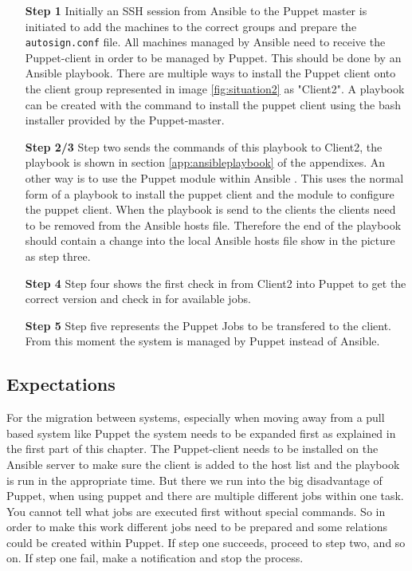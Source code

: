 \indent
\begin{itemize}
    \item[\bf Step 1] Initially an SSH session from Ansible to the Puppet master is initiated to add the machines to the correct groups and prepare the \texttt{autosign.conf} file. All machines managed by Ansible need to receive the Puppet-client in order to be managed by Puppet. This should be done by an Ansible playbook. There are multiple ways to install the Puppet client onto the client group represented in image \ref{fig:situation2} as "Client2". A playbook can be created with the command to install the puppet client using the bash installer provided by the Puppet-master.
    \item[\bf Step 2/3] Step two sends the commands of this playbook to Client2, the playbook is shown in section \ref{app:ansibleplaybook} of the appendixes. An other way is to use the Puppet module within Ansible \cite{ansiblepuppet}. This uses the normal form of a playbook to install the puppet client and the module to configure the puppet client. When the playbook is send to the clients the clients need to be removed from the Ansible hosts file. Therefore the end of the playbook should contain a change into the local Ansible hosts file show in the picture as step three.
    \item[\bf Step 4] Step four shows the first check in from Client2 into Puppet to get the correct version and check in for available jobs.
    \item[\bf Step 5] Step five represents the Puppet Jobs to be transfered to the client. From this moment the system is managed by Puppet instead of Ansible.
\end{itemize}

\subsection{Expectations}\label{subsec:expectations}
For the migration between systems, especially when moving away from a pull based system like Puppet the system needs to be expanded first as explained in the first part of this chapter. The Puppet-client needs to be installed on the Ansible server to make sure the client is added to the host list and the playbook is run in the appropriate time. But there we run into the big disadvantage of Puppet, when using puppet and there are multiple different jobs within one task. You cannot tell what jobs are executed first without special commands. So in order to make this work different jobs need to be prepared and some relations could be created within Puppet. If step one succeeds, proceed to step two, and so on. If step one fail, make a notification and stop the process.  


